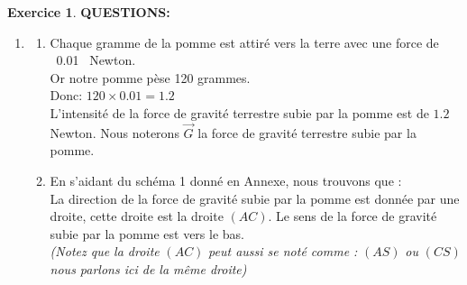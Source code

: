 \documentclass[a4paper,10.9pt]{article}
\theoremstyle{definition}
\newtheorem{exo}{Exercice}
\begin{document}
\begin{exo}
\textbf{QUESTIONS:}\\
\begin{enumerate}
	\item 
	 \begin{enumerate}
	 	\item Chaque gramme de la pomme est attiré vers la terre avec une force de ~0.01~ Newton.\\ 
	 	Or notre pomme pèse 120 grammes.\\
		Donc: \quad $120 \times 0.01 = 1.2$\\
	 	L'intensité de la force de gravité terrestre subie par la pomme est de $1.2$ Newton. Nous noterons $\vec{G}$ la force de gravité terrestre subie par la pomme.\\
	 	\item En s'aidant du schéma 1 donné en Annexe, nous trouvons que :\\
	 	 La direction de la force de gravité subie par la pomme est donnée par une droite, cette droite est la droite $\left(AC\right)$. Le sens de la force de gravité subie par la pomme est vers le bas.\\ \textit{(Notez que la droite } $\left(AC\right)$ \textit{peut aussi se noté comme : } $\left(AS\right)$ \textit{ou} $\left(CS\right)$ \textit{nous parlons ici de la même droite)} \\
	 \end{enumerate} 
	 

\end{enumerate}
\end{exo}
\end{document}
